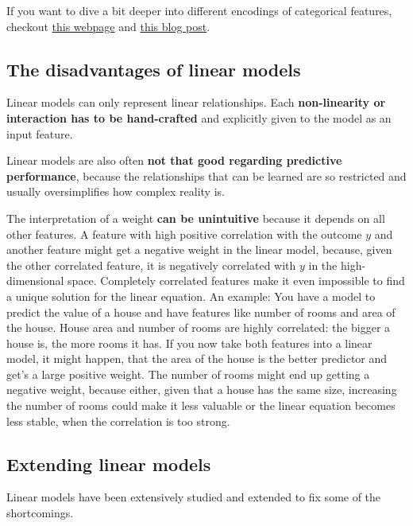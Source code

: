 \documentclass[12pt,]{krantz}
\theoremstyle{definition}
\theoremstyle{definition}
\theoremstyle{definition}
\theoremstyle{remark}
\begin{document}
If you want to dive a bit deeper into different encodings of categorical
features, checkout
\href{http://stats.idre.ucla.edu/r/library/r-library-contrast-coding-systems-for-categorical-variables/}{this
webpage} and \href{http://heidiseibold.github.io/page7/}{this blog
post}.

\subsection{The disadvantages of linear
models}\label{the-disadvantages-of-linear-models}

Linear models can only represent linear relationships. Each
\textbf{non-linearity or interaction has to be hand-crafted} and
explicitly given to the model as an input feature.

Linear models are also often \textbf{not that good regarding predictive
performance}, because the relationships that can be learned are so
restricted and usually oversimplifies how complex reality is.

The interpretation of a weight \textbf{can be unintuitive} because it
depends on all other features. A feature with high positive correlation
with the outcome \(y\) and another feature might get a negative weight
in the linear model, because, given the other correlated feature, it is
negatively correlated with \(y\) in the high-dimensional space.
Completely correlated features make it even impossible to find a unique
solution for the linear equation. An example: You have a model to
predict the value of a house and have features like number of rooms and
area of the house. House area and number of rooms are highly correlated:
the bigger a house is, the more rooms it has. If you now take both
features into a linear model, it might happen, that the area of the
house is the better predictor and get's a large positive weight. The
number of rooms might end up getting a negative weight, because either,
given that a house has the same size, increasing the number of rooms
could make it less valuable or the linear equation becomes less stable,
when the correlation is too strong.

\subsection{Extending linear models}\label{extending-linear-models}

Linear models have been extensively studied and extended to fix some of
the shortcomings.
\end{document}
